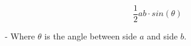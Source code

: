 \vspace{1em}
\sffamily
\bgroup

$$\frac{1}{2} ab \cdot sin(\theta)$$

- Where $\theta$ is the angle between side $a$ and side $b$.
\egroup
\vspace{1em}